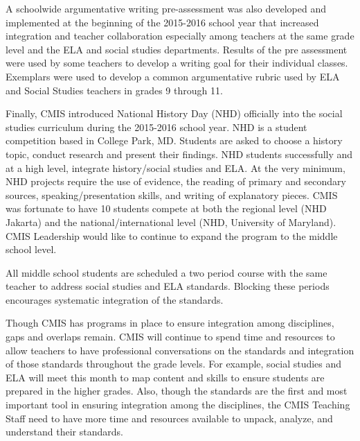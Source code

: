 \begin{findings}
A schoolwide argumentative writing pre-assessment was also developed and implemented at the beginning of the 2015-2016 school year that increased integration and teacher collaboration especially among teachers at the same grade level and the ELA  and social studies departments. Results of the pre assessment were used by some teachers to develop a writing goal for their individual classes. Exemplars were used to develop a common argumentative rubric used by ELA and Social Studies teachers in grades 9 through 11. 


Finally, CMIS introduced National History Day (NHD) officially into the social studies curriculum during the 2015-2016 school year. NHD is a student competition based in College Park, MD. Students are asked to choose a history topic, conduct research and present their findings. NHD students successfully and at a high level, integrate history/social studies and ELA. At the very minimum, NHD projects require the use of evidence, the reading of primary and secondary sources, speaking/presentation skills, and writing of explanatory pieces. CMIS was fortunate to have  10 students compete at both the regional level (NHD Jakarta) and the national/international level (NHD, University of Maryland). CMIS Leadership would like to continue to expand the program to the middle school level. 


All middle school students are scheduled a two period course with the same teacher to address social studies and ELA standards. Blocking these periods encourages systematic integration of the standards. 


Though CMIS has programs in place to ensure integration among disciplines, gaps and overlaps remain. CMIS will continue to spend time and resources to allow teachers to have professional conversations on the standards and integration of those standards throughout the grade levels. For example, social studies and ELA will meet this month to map content and skills to ensure students are prepared in the higher grades. Also, though the standards are the first and most important tool in ensuring integration among the disciplines, the CMIS Teaching Staff need to have more time and resources available to unpack, analyze, and understand their standards. 
\end{findings}

